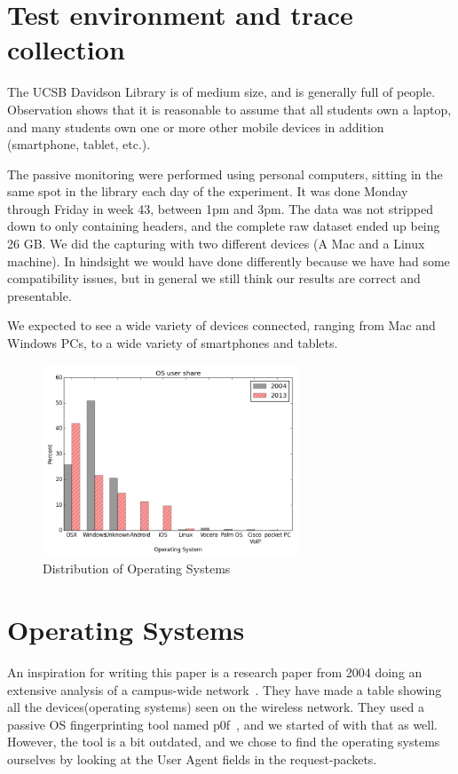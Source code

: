 \documentclass[letterpaper,twocolumn,10pt]{article}
\begin{document}
\section{Test environment and trace collection}

The UCSB Davidson Library is of medium size, and is generally full of people. Observation shows that it is reasonable to assume that all students own a laptop, and many students own one or more other mobile devices in addition (smartphone, tablet, etc.). 

The passive monitoring were performed using personal computers, sitting in the same spot in the library each day of the experiment. It was done Monday through Friday in week 43, between 1pm and 3pm. The data was not stripped down to only containing headers, and the complete raw dataset ended up being 26 GB. We did the capturing with two different devices (A Mac and a Linux machine). In hindsight we would have done differently because we have had some compatibility issues, but in general we still think our results are correct and presentable.

We expected to see a wide variety of devices connected, ranging from Mac and Windows PCs, to a wide variety of smartphones and tablets.

\begin{figure}[!htb] 
\begin{center} 
\includegraphics[width=3in]{os.png} 
\caption{Distribution of Operating Systems} 
\label{fig:os} 
\end{center} 
\end{figure}

\section{Operating Systems}

An inspiration for writing this paper is a research paper from 2004 doing an extensive analysis of a campus-wide network~\cite{Campus2004}. They have made a table showing all the devices(operating systems) seen on the wireless network. They used a passive OS fingerprinting tool named p0f~\cite{p0f}, and we started of with that as well. However, the tool is a bit outdated, and we chose to find the operating systems ourselves by looking at the User Agent fields in the request-packets.
 
\end{document}
